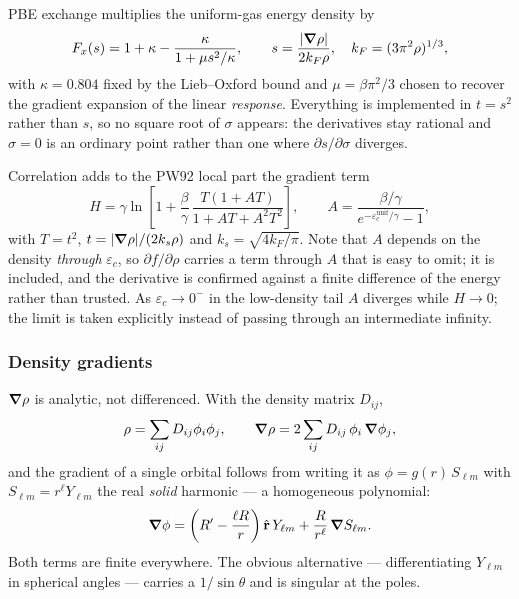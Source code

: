 \documentclass[11pt,a4paper]{article}
\begin{document}
PBE exchange multiplies the uniform-gas energy density by
\begin{equation}
  F_x(s) = 1 + \kappa - \frac{\kappa}{1 + \mu s^2/\kappa},
  \qquad
  s = \frac{\abs{\grad\rho}}{2 k_F \rho},
  \quad k_F = (3\pi^2\rho)^{1/3},
\end{equation}
with $\kappa = 0.804$ fixed by the Lieb--Oxford bound and $\mu = \beta\pi^2/3$
chosen to recover the gradient expansion of the linear \emph{response}.
Everything is implemented in $t = s^2$ rather than $s$, so no square root of
$\sigma$ appears: the derivatives stay rational and $\sigma = 0$ is an
ordinary point rather than one where $\partial s/\partial\sigma$ diverges.

Correlation adds to the PW92 local part the gradient term
\begin{equation}
  H = \gamma \ln\!\left[ 1 + \frac{\beta}{\gamma}\,
      \frac{T(1 + AT)}{1 + AT + A^2T^2} \right],
  \qquad
  A = \frac{\beta/\gamma}{e^{-\varepsilon_c^{\text{unif}}/\gamma} - 1},
\end{equation}
with $T = t^2$, $t = \abs{\grad\rho}/(2k_s\rho)$ and $k_s = \sqrt{4k_F/\pi}$.
Note that $A$ depends on the density \emph{through} $\varepsilon_c$, so
$\partial f/\partial\rho$ carries a term through $A$ that is easy to omit; it
is included, and the derivative is confirmed against a finite difference of
the energy rather than trusted. As $\varepsilon_c \to 0^-$ in the low-density
tail $A$ diverges while $H \to 0$; the limit is taken explicitly instead of
passing through an intermediate infinity.

\subsubsection{Density gradients}

$\grad\rho$ is analytic, not differenced. With the density matrix $D_{ij}$,
\begin{equation}
  \rho = \sum_{ij} D_{ij}\phi_i\phi_j,
  \qquad
  \grad\rho = 2\sum_{ij} D_{ij}\,\phi_i\,\grad\phi_j,
\end{equation}
and the gradient of a single orbital follows from writing it as
$\phi = g(r)\,S_{\ell m}$ with $S_{\ell m} = r^{\ell}Y_{\ell m}$ the real
\emph{solid} harmonic --- a homogeneous polynomial:
\begin{equation}
  \grad\phi = \left( R' - \frac{\ell R}{r} \right) \hat{\vb{r}}\, Y_{\ell m}
            + \frac{R}{r^{\ell}}\,\grad S_{\ell m}.
  \label{eq:gradphi}
\end{equation}
Both terms are finite everywhere. The obvious alternative --- differentiating
$Y_{\ell m}$ in spherical angles --- carries a $1/\sin\theta$ and is singular
at the poles.
\end{document}
